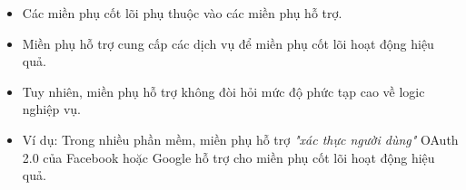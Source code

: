 \begin{itemize}

    \item         Các miền phụ cốt lõi phụ thuộc vào các miền phụ hỗ trợ.

    \item         Miền phụ hỗ trợ cung cấp các dịch vụ để miền phụ cốt lõi hoạt động hiệu quả.

    \item         Tuy nhiên, miền phụ hỗ trợ không đòi hỏi mức độ phức tạp cao về logic nghiệp vụ.

    \item         Ví dụ: Trong nhiều phần mềm, miền phụ hỗ trợ \textit{"xác thực người dùng"} OAuth 2.0 của Facebook hoặc Google hỗ trợ cho miền phụ cốt lõi hoạt động hiệu quả.





\end{itemize}